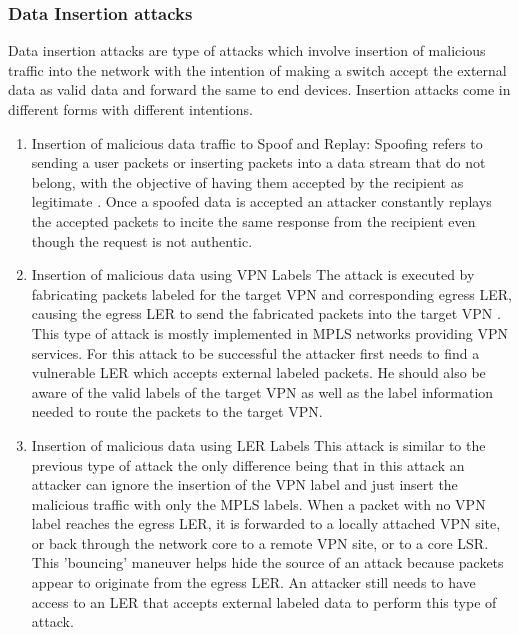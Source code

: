 \subsubsection{Data Insertion attacks}
Data insertion attacks are type of attacks which involve insertion of malicious traffic into the network with the intention of making a switch accept the external data as valid data and forward the same to end devices. Insertion attacks come in different forms with different intentions.
\begin{enumerate}
\item Insertion of malicious data traffic to Spoof and Replay:
Spoofing refers to sending a user packets or inserting packets into a data stream that do not belong, with the objective of having them accepted by the recipient as legitimate \cite{rfc5920}. Once a spoofed data is accepted an attacker constantly replays the accepted packets to incite the same response from the recipient even though the request is not authentic.

\item Insertion of malicious data using VPN Labels
The attack is executed by fabricating packets labeled for the target VPN and corresponding egress LER, causing the egress LER to send the fabricated packets into the target VPN \cite{grayson2009analysis}. This type of attack is mostly implemented in MPLS networks providing VPN services. For this attack to be successful the attacker first needs to find a vulnerable LER which accepts external labeled packets. He should also be aware of the valid labels of the target VPN as well as the label information needed to route the packets to the target VPN.

\item Insertion of malicious data using LER Labels
This attack is similar to the previous type of attack the only difference being that in this attack an attacker can ignore the insertion of the VPN label and just insert the malicious traffic with only the MPLS labels. When a packet with no VPN label reaches the egress LER, it is forwarded to a locally attached VPN site, or back through the network core to a remote VPN site, or to a core LSR. This 'bouncing' maneuver helps hide the source of an attack because packets appear to originate from the egress LER. An attacker still needs to have access to an LER that accepts external labeled data to perform this type of attack.
\end{enumerate}
    

